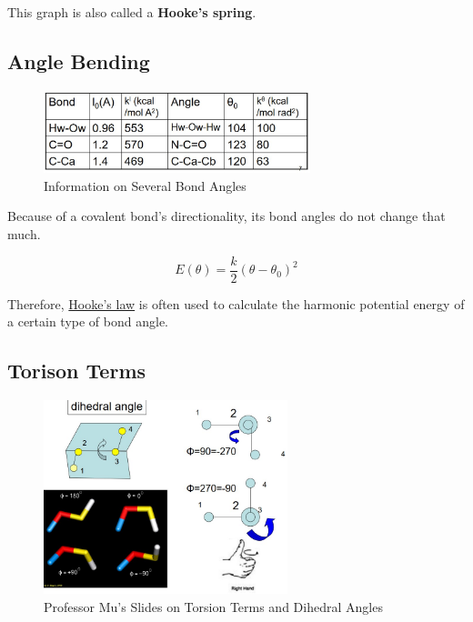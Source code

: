 \documentclass[
  letterpaper,
  DIV=11,
  numbers=noendperiod]{scrreprt}
\begin{document}
This graph is also called a \textbf{Hooke's spring}.

\hypertarget{angle-bending}{%
\subsection{Angle Bending}\label{angle-bending}}

\begin{figure}

{\centering \includegraphics[width=3.05in,height=\textheight]{./images/wk2/bondangle.jpg}

}

\caption{Information on Several Bond Angles}

\end{figure}

Because of a covalent bond's directionality, its bond angles do not
change that much.

\begin{equation}
  E(\theta) = \frac{k}{2}(\theta - \theta_0)^2
\end{equation}

Therefore,
\href{https://www.khanacademy.org/science/physics/work-and-energy/hookes-law/a/what-is-hookes-law}{Hooke's
law} is often used to calculate the harmonic potential energy of a
certain type of bond angle.

\hypertarget{torison-terms}{%
\subsection{Torison Terms}\label{torison-terms}}

\begin{figure}

{\centering \includegraphics[width=2.79in,height=\textheight]{./images/wk2/torsional.jpg}

}

\caption{Professor Mu's Slides on Torsion Terms and Dihedral Angles}

\end{figure}
\end{document}
